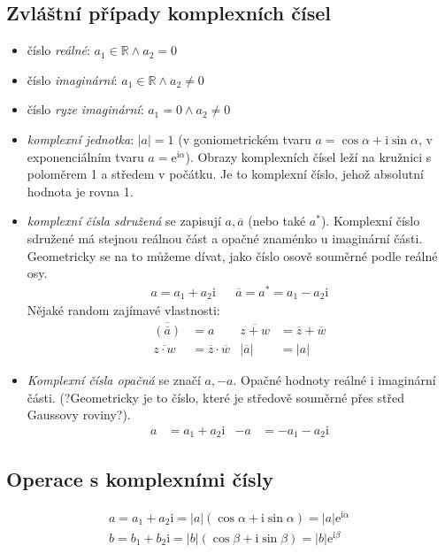 \documentclass[12pt]{article}
\providecommand{\abs}[1]{\lvert#1\rvert}
\newcommand{\euler}{\mathrm{e}} %
\newcommand{\iu}{\mathrm{i}} %
\newcommand{\nR}{\mathbb{R}} %
\begin{document}
\subsection{Zvláštní případy komplexních čísel}
\begin{itemize}
\item číslo \emph{reálné}: $a_1 \in \nR \land a_2 = 0$
\item číslo \emph{imaginární}: $a_1 \in \nR \land a_2 \neq 0$
\item číslo \emph{ryze imaginární}: $a_1 = 0 \land a_2 \neq 0$
\item \emph{komplexní jednotka}: $\abs{a} = 1$  (v goniometrickém tvaru $a = \cos \alpha + \iu \sin \alpha$, v exponenciálním tvaru $a = \euler^{\iu \alpha}$). Obrazy komplexních čísel leží na kružnici s poloměrem 1 a středem v počátku. Je to komplexní číslo, jehož absolutní hodnota je rovna 1.
\item \emph{komplexní čísla sdružená} se zapisují $a, \overline{a}$ (nebo také $a^*$). Komplexní číslo sdružené má stejnou reálnou část a opačné znaménko u imaginární části. Geometricky se na to můžeme dívat, jako číslo osově souměrné podle reálné osy.
\begin{align}
a = a_1 + a_2 \iu && \overline{a}=a^*=a_1 - a_2 \iu
\end{align}
Nějaké random zajímavé vlastnosti:
\begin{align*}
\overline{(\overline{a})} &= a & \overline{z + w} &= \overline{z} + \overline{w} \\
\overline{z \cdot w} &= \overline{z} \cdot \overline{w} & \abs{\overline{a}} &= \abs{a}
\end{align*}
\item \emph{Komplexní čísla opačná} se značí $a, -a$. Opačné hodnoty reálné i imaginární části. (?Geometricky je to číslo, které je středově  souměrné přes střed Gaussovy roviny?).
\begin{align}
a &= a_1 + a_2 \iu & -a &= -a_1 -a_2 \iu
\end{align}
\end{itemize}
\subsection{Operace s komplexními čísly}
\begin{align}
a = a_1 + a_2 \iu = \abs{a}(\cos \alpha + \iu \sin \alpha) = \abs{a} \euler^{\iu \alpha}\\
b = b_1 + b_2 \iu = \abs{b}(\cos \beta + \iu \sin \beta) = \abs{b} \euler^{\iu \beta}
\end{align}
\end{document}
